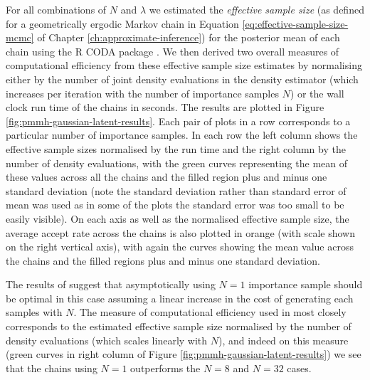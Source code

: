For all combinations of $N$ and $\lambda$ we estimated the \emph{effective sample size} (as defined for a geometrically ergodic Markov chain in Equation \ref{eq:effective-sample-size-mcmc} of Chapter \ref{ch:approximate-inference}) for the posterior mean of each chain using the R CODA package \citep{plummer2006coda}. We then derived two overall measures of computational efficiency from these effective sample size estimates by normalising either by the number of joint density evaluations in the density estimator (which increases per iteration with the number of importance samples $N$) or the wall clock run time of the chains in seconds. The results are plotted in Figure \ref{fig:pmmh-gaussian-latent-results}. Each pair of plots in a row corresponds to a particular number of importance samples. In each row the left column shows the effective sample sizes normalised by the run time and the right column by the number of density evaluations, with the green curves representing the mean of these values across all the chains and the filled region plus and minus one standard deviation (note the standard deviation rather than standard error of mean was used as in some of the plots the standard error was too small to be easily visible). On each axis as well as the normalised effective sample size, the average accept rate across the chains is also plotted in orange (with scale shown on the right vertical axis), with again the curves showing the mean value across the chains and the filled regions plus and minus one standard deviation.

The results of \citep{sherlock2016pseudo} suggest that asymptotically using $N=1$ importance sample should be optimal in this case assuming a linear increase in the cost of generating each samples with $N$. The measure of computational efficiency used in \citep{sherlock2016pseudo} most closely corresponds to the estimated effective sample size normalised by the number of density evaluations (which scales linearly with $N$), and indeed on this measure (green curves in right column of Figure \ref{fig:pmmh-gaussian-latent-results}) we see that the chains using $N=1$ outperforms the $N=8$ and $N=32$ cases.


